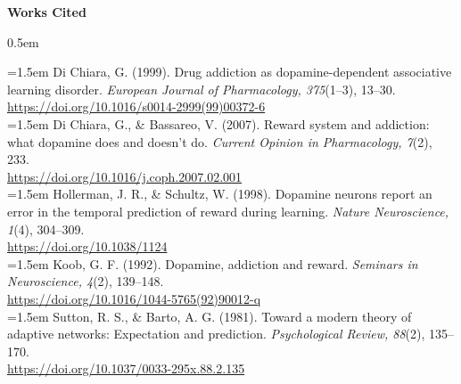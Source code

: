 \documentclass[11pt]{article}
\begin{document}
\pagebreak

\begin{center}
    \large
    \textbf{Works Cited}
\end{center}

\vspace{1em}

\normalsize
\openup 0.5em

\noindent \hangindent=1.5em
Di Chiara, G. (1999). Drug addiction as dopamine-dependent associative learning disorder. \textit{European Journal of Pharmacology, 375}(1–3), 13–30. \\
\url{https://doi.org/10.1016/s0014-2999(99)00372-6} \\

\noindent \hangindent=1.5em
Di Chiara, G., \& Bassareo, V. (2007). Reward system and addiction: what dopamine does and doesn’t do. \textit{Current Opinion in Pharmacology, 7}(2), 233. \\
\url{https://doi.org/10.1016/j.coph.2007.02.001} \\

\noindent \hangindent=1.5em
Hollerman, J. R., \& Schultz, W. (1998). Dopamine neurons report an error in the temporal prediction of reward during learning. \textit{Nature Neuroscience, 1}(4), 304–309. \\
\url{https://doi.org/10.1038/1124} \\

\noindent \hangindent=1.5em
Koob, G. F. (1992). Dopamine, addiction and reward. \textit{Seminars in Neuroscience, 4}(2), 139–148. \\
\url{https://doi.org/10.1016/1044-5765(92)90012-q} \\

\noindent \hangindent=1.5em
Sutton, R. S., \& Barto, A. G. (1981). Toward a modern theory of adaptive networks: Expectation and prediction. \textit{Psychological Review, 88}(2), 135–170. \\
\url{https://doi.org/10.1037/0033-295x.88.2.135} \\
\end{document}

